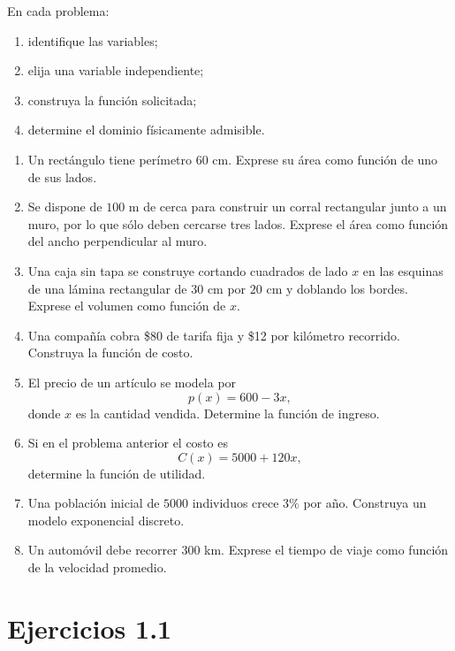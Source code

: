 \documentclass[12pt]{article}
\theoremstyle{remark}
\begin{document}
En cada problema:
\begin{enumerate}[label=\alph*)]
    \item identifique las variables;
    \item elija una variable independiente;
    \item construya la función solicitada;
    \item determine el dominio físicamente admisible.
\end{enumerate}

\begin{enumerate}
    \item Un rectángulo tiene perímetro $60$ cm. Exprese su área como función
    de uno de sus lados.

    \item Se dispone de $100$ m de cerca para construir un corral rectangular
    junto a un muro, por lo que sólo deben cercarse tres lados. Exprese el área
    como función del ancho perpendicular al muro.

    \item Una caja sin tapa se construye cortando cuadrados de lado $x$ en las
    esquinas de una lámina rectangular de $30$ cm por $20$ cm y doblando los
    bordes. Exprese el volumen como función de $x$.

    \item Una compañía cobra \$80 de tarifa fija y \$12 por kilómetro recorrido.
    Construya la función de costo.

    \item El precio de un artículo se modela por
    \[
    p(x)=600-3x,
    \]
    donde $x$ es la cantidad vendida. Determine la función de ingreso.

    \item Si en el problema anterior el costo es
    \[
    C(x)=5000+120x,
    \]
    determine la función de utilidad.

    \item Una población inicial de $5000$ individuos crece $3\%$ por año.
    Construya un modelo exponencial discreto.

    \item Un automóvil debe recorrer $300$ km. Exprese el tiempo de viaje como
    función de la velocidad promedio.
\end{enumerate}



\section*{Ejercicios 1.1}
\end{document}
